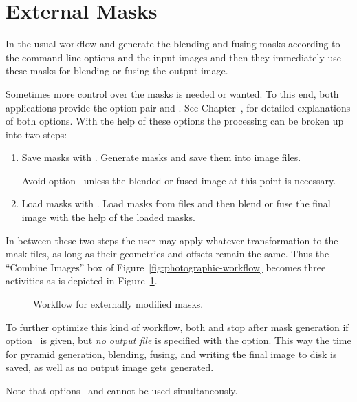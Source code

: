 

\section[External Masks]{External Masks
  \label{sec:external-masks}
  }

In the usual workflow  and 
generate the blending and fusing masks according to the command-line
options and the input images and then they immediately use these masks
for blending or fusing the output image.

Sometimes more control over the masks is needed or wanted.  To this
end, both applications provide the option pair 
and .  See Chapter~, for
detailed explanations of both options.  With the help of these options
the processing can be broken up into two steps:

\begin{enumerate}
\item
  Save masks with .  Generate masks and save them
  into image files.

  Avoid option~ unless the blended or fused image at
  this point is necessary.

\item
  Load masks with .  Load masks from files and
  then blend or fuse the final image with the help of the loaded
  masks.
\end{enumerate}

In between these two steps the user may apply whatever transformation
to the mask files, as long as their geometries and offsets remain the
same.  Thus the ``Combine Images'' box of
Figure~\ref{fig:photographic-workflow} becomes three activities as is
depicted in Figure~\ref{fig:external-mask-workflow}.

\begin{figure}[htbp]
  \begin{maxipage}
    \centering
  \end{maxipage}

  \caption[External mask workflow]{Workflow for externally modified
    masks.\label{fig:external-mask-workflow}}

\end{figure}

To further optimize this kind of workflow, both 
and  stop after mask generation if
option~ is given, but \emph{no output file} is
specified with the  option.  This way the time for
pyramid generation, blending, fusing, and writing the final image to
disk is saved, as well as no output image gets generated.

Note that options~ and 
cannot be used simultaneously.
